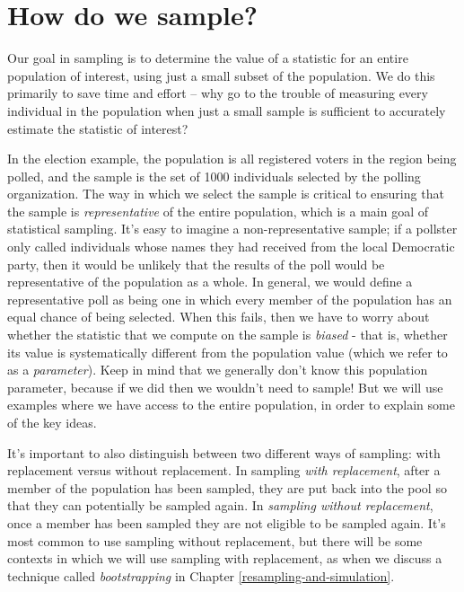 \documentclass[12pt,]{book}
\theoremstyle{definition}
\theoremstyle{definition}
\theoremstyle{definition}
\theoremstyle{remark}
\begin{document}
\hypertarget{how-do-we-sample}{%
\section{How do we sample?}\label{how-do-we-sample}}

Our goal in sampling is to determine the value of a statistic for an entire population of interest, using just a small subset of the population. We do this primarily to save time and effort -- why go to the trouble of measuring every individual in the population when just a small sample is sufficient to accurately estimate the statistic of interest?

In the election example, the population is all registered voters in the region being polled, and the sample is the set of 1000 individuals selected by the polling organization. The way in which we select the sample is critical to ensuring that the sample is \emph{representative} of the entire population, which is a main goal of statistical sampling. It's easy to imagine a non-representative sample; if a pollster only called individuals whose names they had received from the local Democratic party, then it would be unlikely that the results of the poll would be representative of the population as a whole. In general, we would define a representative poll as being one in which every member of the population has an equal chance of being selected. When this fails, then we have to worry about whether the statistic that we compute on the sample is \emph{biased} - that is, whether its value is systematically different from the population value (which we refer to as a \emph{parameter}). Keep in mind that we generally don't know this population parameter, because if we did then we wouldn't need to sample! But we will use examples where we have access to the entire population, in order to explain some of the key ideas.

It's important to also distinguish between two different ways of sampling: with replacement versus without replacement. In sampling \emph{with replacement}, after a member of the population has been sampled, they are put back into the pool so that they can potentially be sampled again. In \emph{sampling without replacement}, once a member has been sampled they are not eligible to be sampled again. It's most common to use sampling without replacement, but there will be some contexts in which we will use sampling with replacement, as when we discuss a technique called \emph{bootstrapping} in Chapter \ref{resampling-and-simulation}.
\end{document}
